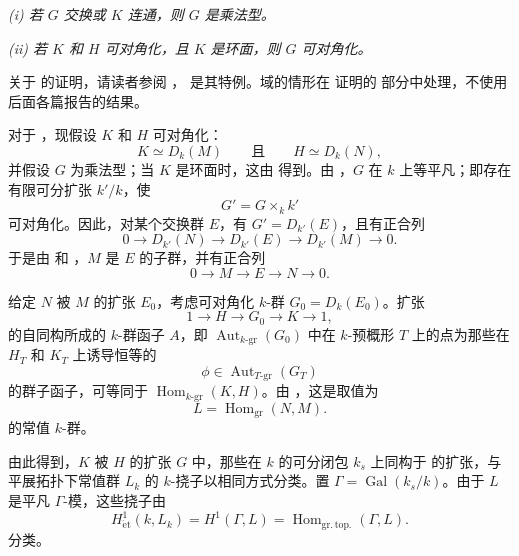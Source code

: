 \textit{(i) 若 \(G\) 交换或 \(K\) 连通，则 \(G\) 是乘法型。}

\textit{(ii) 若 \(K\) 和 \(H\) 可对角化，且 \(K\) 是环面，则 \(G\) 可对角化。}

关于  的证明，请读者参阅 ， 是其特例。域的情形在  证明的  部分中处理，不使用后面各篇报告的结果。

对于 ，现假设 \(K\) 和 \(H\) 可对角化：
\[
  K\simeq D_k(M)
  \qquad\text{且}\qquad
  H\simeq D_k(N),
\]
并假设 \(G\) 为乘法型；当 \(K\) 是环面时，这由  得到。由 ，\(G\) 在 \(k\) 上等平凡；即存在有限可分扩张 \(k'/k\)，使
\[
  G'=G\times_k k'
\]
可对角化。因此，对某个交换群 \(E\)，有 \(G'=D_{k'}(E)\)，且有正合列
\begin{equation}
  \tag{1}
  0\longrightarrow D_{k'}(N)\longrightarrow D_{k'}(E)
    \longrightarrow D_{k'}(M)\longrightarrow 0.
\end{equation}
于是由  和 ，\(M\) 是 \(E\) 的子群，并有正合列
\begin{equation}
  \tag{2}
  0\longrightarrow M\longrightarrow E\longrightarrow N\longrightarrow 0.
\end{equation}

给定 \(N\) 被 \(M\) 的扩张 \(E_0\)，考虑可对角化 \(k\)-群 \(G_0=D_k(E_0)\)。扩张
\begin{equation}
  \tag{3}
  1\longrightarrow H\longrightarrow G_0\longrightarrow K\longrightarrow 1,
\end{equation}
的自同构所成的 \(k\)-群函子 \(A\)，即
\(\operatorname{Aut}_{k\text{-}\mathrm{gr}}(G_0)\)
中在 \(k\)-预概形 \(T\) 上的点为那些在 \(H_T\) 和 \(K_T\) 上诱导恒等的
\[
  \phi\in\operatorname{Aut}_{T\text{-}\mathrm{gr}}(G_T)
\]
的群子函子，可等同于 \(\operatorname{Hom}_{k\text{-}\mathrm{gr}}(K,H)\)。由 ，这是取值为
\[
  L=\operatorname{Hom}_{\mathrm{gr}}(N,M).
\]
的常值 \(k\)-群。

由此得到，\(K\) 被 \(H\) 的扩张 \(G\) 中，那些在 \(k\) 的可分闭包 \(k_s\) 上同构于  的扩张，与平展拓扑下常值群 \(L_k\) 的 \(k\)-挠子以相同方式分类。置 \(\Gamma=\operatorname{Gal}(k_s/k)\)。由于 \(L\) 是平凡 \(\Gamma\)-模，这些挠子由
\[
  H^1_{\mathrm{\acute et}}(k,L_k)
  =H^1(\Gamma,L)
  =\operatorname{Hom}_{\mathrm{gr.\,top.}}(\Gamma,L).
\]
分类。

